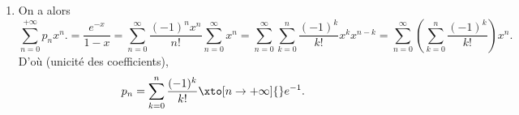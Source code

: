 \begin{enonce}
\begin{solution}
\begin{enumerate}
    \item On a alors
    \begin{equation*}
        \sum_{n=0}^{+\infty} p_n x^n.
        = \frac{e^{-x}}{1-x}
        = \sum_{n=0}^{\infty} \frac{(-1)^n x^n}{n!} \sum_{n=0}^{\infty} x^n
        = \sum_{n=0}^{\infty} \sum_{k=0}^{n} \frac{(-1)^k}{k!}x^k x^{n-k}
        = \sum_{n=0}^{\infty} \left(\sum_{k=0}^{n} \frac{(-1)^k}{k!}\right) x^{n}.
      \end{equation*}
      D'où (unicité des coefficients),
      \begin{equation*}
        p_n = \sum_{k=0}^{n} \frac{(-1)^k}{k!} \xto[n\to+\infty]{} e^{-1}.
      \end{equation*}

  \end{enumerate}
\end{solution}
\end{enonce}
